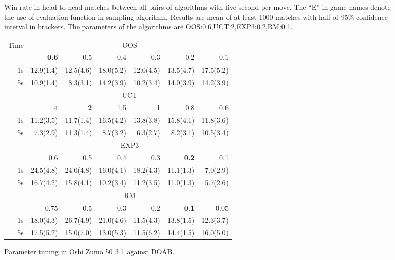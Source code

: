 \begin{figure}
\begin{scriptsize}
\end{scriptsize}
\caption{Win-rate in head-to-head matches between all pairs of algorithms with five second per move. The ``E'' in game names denote the use of evaluation function in sampling algorithm. Results are mean of at least 1000 matches with half of 95\% confidence interval in brackets. The parameters of the algorithms are OOS:0.6,UCT:2,EXP3:0.2,RM:0.1.}\label{fig:matches5}
\end{figure}

\begin{figure}
\begin{scriptsize}
\begin{tabular}{|r|rrrrrr|}\hline
Time&\multicolumn{6}{|c|}{OOS}\\
&\textbf{0.6}&0.5&0.4&0.3&0.2&0.1\\
1s&12.9(1.4)&12.5(4.6)&18.0(5.2)&12.0(4.5)&13.5(4.7)&17.5(5.2)\\
5s&10.9(1.4)&8.3(3.1)&14.2(3.9)&10.2(3.4)&14.0(3.9)&14.2(3.9)\\\hline
&\multicolumn{6}{|c|}{UCT}\\
&4&\textbf{2}&1.5&1&0.8&0.6\\
1s&11.2(3.5)&11.7(1.4)&16.5(4.2)&13.8(3.8)&15.8(4.1)&11.8(3.6)\\
5s&7.3(2.9)&11.3(1.4)&8.7(3.2)&6.3(2.7)&8.2(3.1)&10.5(3.4)\\\hline
&\multicolumn{6}{|c|}{EXP3}\\
&0.6&0.5&0.4&0.3&\textbf{0.2}&0.1\\
1s&24.5(4.8)&24.0(4.8)&16.0(4.1)&18.2(4.3)&11.1(1.3)&7.0(2.9)\\
5s&16.7(4.2)&15.8(4.1)&10.2(3.4)&11.2(3.5)&11.0(1.3)&5.7(2.6)\\\hline
&\multicolumn{6}{|c|}{RM}\\
&0.75&0.5&0.3&0.2&\textbf{0.1}&0.05\\
1s&18.0(4.3)&26.7(4.9)&21.0(4.6)&11.5(4.3)&13.8(1.5)&12.3(3.7)\\
5s&17.5(5.2)&15.0(7.0)&13.0(5.3)&11.5(6.2)&14.4(1.5)&16.0(5.0)\\\hline
\end{tabular}
\end{scriptsize}
\caption{Parameter tuning in Oshi Zumo 50 3 1 against DOAB.}\label{fig:tuning}
\end{figure}

